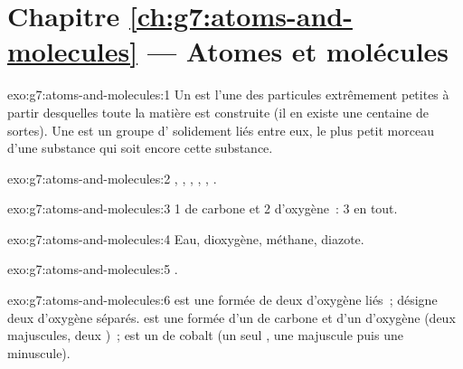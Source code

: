 \section*{Chapitre \ref{ch:g7:atoms-and-molecules} --- Atomes et molécules}

\begin{solution}{exo:g7:atoms-and-molecules:1}
Un  est l'une des particules extrêmement petites à partir
desquelles toute la matière est construite (il en existe une centaine
de sortes). Une  est un groupe d' solidement liés entre
eux, le plus petit morceau d'une substance qui soit encore cette
substance.
\end{solution}

\begin{solution}{exo:g7:atoms-and-molecules:2}
, , , , , .
\end{solution}

\begin{solution}{exo:g7:atoms-and-molecules:3}
1  de carbone et 2  d'oxygène~: 3  en tout.
\end{solution}

\begin{solution}{exo:g7:atoms-and-molecules:4}
Eau, dioxygène, méthane, diazote.
\end{solution}

\begin{solution}{exo:g7:atoms-and-molecules:5}
.
\end{solution}

\begin{solution}{exo:g7:atoms-and-molecules:6}
 est une  formée de deux  d'oxygène liés~; 
désigne deux  d'oxygène séparés.  est une  formée
d'un  de carbone et d'un  d'oxygène (deux majuscules, deux
)~;  est un  de cobalt (un seul , une
majuscule puis une minuscule).
\end{solution}

